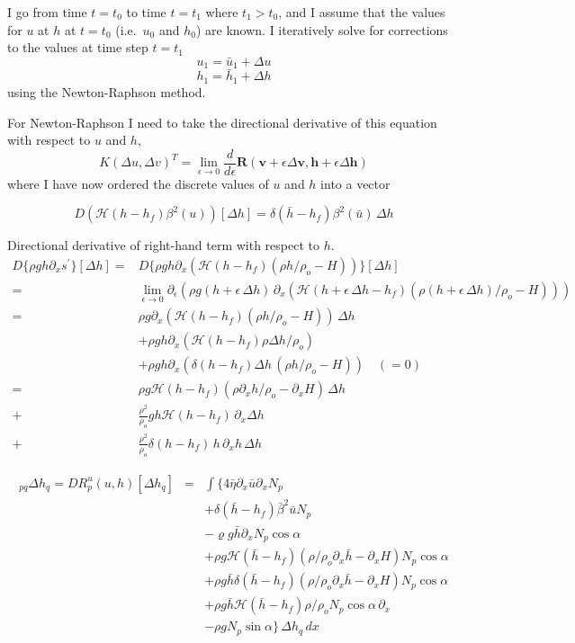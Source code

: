 \documentclass[10pt,a4paper]{book}
\newcommand{\He}{\mathcal{H}}
\newcommand{\p}{\partial}
\begin{document}
I go from time  $t=t_0$ to time $t=t_1$ where $t_1> t_0$, and I assume that the values for $u$ at
$h$ at $t=t_0$ (i.e.\ $u_0$ and $h_0$) are known. I
iteratively solve for corrections to the values at time step $t=t_1$
\[ u_1=\bar{u}_1+\Delta u \]
\[ h_1=\bar{h}_1+\Delta h \]
using the Newton-Raphson method.



For Newton-Raphson  I need to take the directional derivative of this equation with respect to $u$
and $h$, 
\[
K (\Delta u , \Delta v)^T=\lim_{\epsilon \to 0} \frac{d}{d\epsilon} \bm{R}(\bm{v}+\epsilon \Delta \bm{v}, \bm{h}+\epsilon \Delta \bm{h})
\]
where I have now ordered the discrete values of $u$ and $h$ into a vector

\[
D (\He(h-h_f)\beta^2(u))[\Delta h]=\delta(\bar{h}-h_f) \beta^2(\bar{u}) \, \Delta h
\]

Directional derivative of right-hand term with respect to $h$.
\begin{align*}
D\{\rho g h \p_x s^{'}\}[\Delta h]
=&D\{\rho g h \p_x (\He(h-h_f) ( \rho h /\rho_o -H) )\}[\Delta h]\\
=&\lim_{\epsilon \to 0 } \p_{\epsilon} \left ( \rho g (h+\epsilon \, \Delta h) \, \p_x(\He(h+\epsilon\,\Delta h -h_f) ( \rho (h+\epsilon \, \Delta h)/\rho_o -H))\right)\\
=&\rho g \p_x(\He(h-h_f) ( \rho h /\rho_o -H))\, \Delta h \\
&+\rho g h \p_x (\He(h-h_f) \rho \Delta h /\rho_o)\\
&+ \rho g h \p_x ( \delta (h-h_f) \Delta h \, (\rho h /\rho_o -H))\quad (=0)\\
=&\rho g  \He(h-h_f) ( \rho \p_x h /\rho_o - \p_x H) \, \Delta h\\
+&\frac{\rho^2}{\rho_o}  g h \He(h-h_f) \, \p_x \Delta h\\
+&\frac{\rho^2}{\rho_o} \delta(h-h_f) \, h \, \p_x h \, \Delta h
\end{align*}

\begin{eqnarray}
[\mathrm{K}{uh}]_{pq} \Delta h_q=D R^u_p(u,h) [\Delta h_q]&=&\int \{ 4 \bar{\eta} \p_x \bar{u} \p_x N_p \nonumber \\
 & & + \delta(\bar{h}-h_f) \bar{\beta}^2 \bar{u} N_p \nonumber \\
& & - \varrho g \bar{h}  \p_x N_p \cos \alpha \nonumber \\
& & +  \rho g \He(\bar{h}-h_f) (\rho/\rho_o \p_x \bar{h}-\p_x H) N_p \cos \alpha \nonumber \\
& & + \rho g \bar{h} \delta(\bar{h}-h_f) ( \rho/\rho_o \p_x \bar{h}-\p_x H) N_p \cos \alpha \nonumber \\
& & + \rho g \bar{h} \He(\bar{h}-h_f) \rho/\rho_o N_p \cos \alpha \, \p_x \nonumber \\
& & - \rho g N_p \sin \alpha \}  \, \Delta h_q \, dx \nonumber 
\end{eqnarray}
\end{document}
